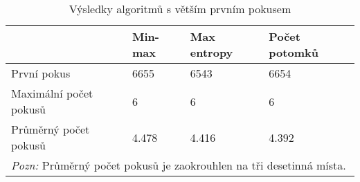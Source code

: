 \begin{table}[h]
\centering
\begin{tabular}{l l l l}
\toprule
 & Min-max & Max entropy & Počet potomků  \\
\midrule

První pokus 
& 6655 & 6543 & 6654  \\


Maximální počet pokusů 
& 6 & 6 & 6  \\

Průměrný počet pokusů 
& 4.478 & 4.416 & 4.392 \\
\bottomrule
\multicolumn{4}{l}{\footnotesize \textit{Pozn:}
Průměrný počet pokusů je zaokrouhlen na tři desetinná místa.}
\end{tabular}
\caption{Výsledky algoritmů s větším prvním pokusem}\label{tabvysokyprvnipokus}
\end{table}







